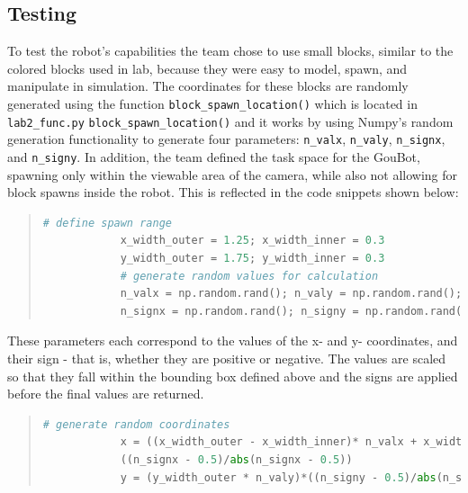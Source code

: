     \subsection{Testing}

        To test the robot's capabilities the team chose to use small blocks, similar to the colored blocks used in lab, because they were easy to model, spawn, and manipulate in simulation. The coordinates for these blocks are randomly generated using the function \lstinline!block_spawn_location()! which is located in \lstinline!lab2_func.py! \lstinline!block_spawn_location()! and it works by using Numpy's random generation functionality to generate four parameters: \lstinline!n_valx!, \lstinline!n_valy!, \lstinline!n_signx!, and \lstinline!n_signy!. In addition, the team defined the task space for the GouBot, spawning only within the viewable area of the camera, while also not allowing for block spawns inside the robot. This is reflected in the code snippets shown below: 
    
        \begin{quote}
            \begin{lstlisting}[gobble=12,language=python]
            # define spawn range
            x_width_outer = 1.25; x_width_inner = 0.3
            y_width_outer = 1.75; y_width_inner = 0.3
            # generate random values for calculation
            n_valx = np.random.rand(); n_valy = np.random.rand(); 
            n_signx = np.random.rand(); n_signy = np.random.rand(); 
            \end{lstlisting}
        \end{quote}
        
        These parameters each correspond to the values of the x- and y- coordinates, and their sign - that is, whether they are positive or negative. The values are scaled so that they fall within the bounding box defined above and the signs are applied before the final values are returned.
        
        \begin{quote}
            \begin{lstlisting}[gobble=12,language=python]
            # generate random coordinates
            x = ((x_width_outer - x_width_inner)* n_valx + x_width_inner) *
            ((n_signx - 0.5)/abs(n_signx - 0.5))
            y = (y_width_outer * n_valy)*((n_signy - 0.5)/abs(n_signy - 0.5))
            \end{lstlisting}
        \end{quote}
        
